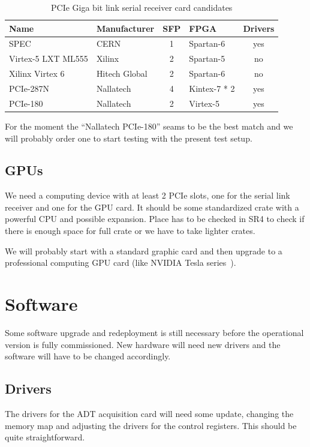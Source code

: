 \begin{table}[H]
\caption{PCIe Giga bit link serial receiver card candidates}
\label{tab:receiver_cards}
\centering
\begin{tabular}{|ll|c|l|c|}
\hline
Name & Manufacturer & SFP & FPGA & Drivers \\
\hline
\hline
SPEC & CERN & 1 & Spartan-6 & yes \\
\hline
Virtex-5 LXT ML555 & Xilinx & 2 & Spartan-5 & no \\
\hline
Xilinx Virtex 6 & Hitech Global & 2 & Spartan-6 & no \\
\hline		
PCIe-287N & Nallatech & 4 & Kintex-7 * 2 & yes \\		
PCIe-180 & Nallatech & 2 & Virtex-5 & yes \\
\hline
\end{tabular}
\end{table}

For the moment the ``Nallatech PCIe-180'' seams to be the best match and we will probably order one to start testing with the present test setup.

\subsection{GPUs}

We need a computing device with at least 2 PCIe slots, one for the serial link receiver and one for the \gls{GPU} card. It should be some standardized crate with a powerful \gls{CPU} and possible expansion. Place has to be checked in SR4 to check if there is enough space for full crate or we have to take lighter crates.

We will probably start with a standard graphic card and then upgrade to a professional computing \gls{GPU} card (like NVIDIA Tesla series~\cite{nvidia}).

\section{Software}

Some software upgrade and redeployment is still necessary before the operational version is fully commissioned. New hardware will need new drivers and the software will have to be changed accordingly.

\subsection{Drivers}

The drivers for the \gls{ADT} acquisition card will need some update, changing the memory map and adjusting the drivers for the control registers. This should be quite straightforward.

